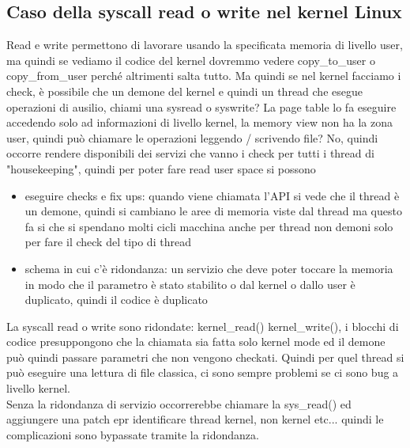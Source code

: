 \documentclass[12pt, oneside]{extbook}
\begin{document}
\subsection{Caso della syscall read o write nel kernel Linux}
Read e write permettono di lavorare usando la specificata memoria di livello user, ma quindi se vediamo il codice del kernel dovremmo vedere copy\_to\_user o copy\_from\_user perché altrimenti salta tutto. Ma quindi se nel kernel facciamo i check, è possibile che un demone del kernel e quindi un thread che esegue operazioni di ausilio, chiami una sysread o syswrite? La page table lo fa eseguire accedendo solo ad informazioni di livello kernel, la memory view non ha la zona user, quindi può chiamare le operazioni leggendo / scrivendo file? No, quindi occorre rendere disponibili dei servizi che vanno i check per tutti i thread di "housekeeping", quindi per poter fare read user space si possono 
\begin{itemize}
\item eseguire checks e fix ups: quando viene chiamata l'API si vede che il thread è un demone, quindi si cambiano le aree di memoria viste dal thread ma questo fa si che si spendano molti cicli macchina anche per thread non demoni solo per fare il check del tipo di thread
\item schema in cui c'è ridondanza: un servizio che deve poter toccare la memoria in modo che il parametro è stato stabilito o dal kernel o dallo user è duplicato, quindi il codice è duplicato
\end{itemize}
La syscall read o write sono ridondate: kernel\_read() kernel\_write(), i blocchi di codice presuppongono che la chiamata sia fatta solo kernel mode ed il demone può quindi passare parametri che non vengono checkati. Quindi per quel thread si può eseguire una lettura di file classica, ci sono sempre problemi se ci sono bug a livello kernel.\\Senza la ridondanza di servizio occorrerebbe chiamare la \textsf{sys\_read()} ed aggiungere una patch epr identificare thread kernel, non kernel etc... quindi le complicazioni sono bypassate tramite la ridondanza.
\end{document}
